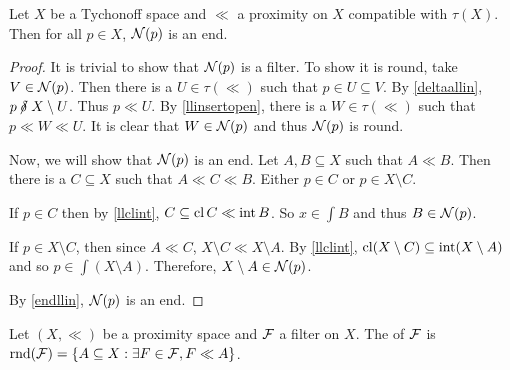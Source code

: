 \begin{theorem}
	\label{Nend}
	Let \( X \) be a Tychonoff space and \( \ll \) a proximity on \( X \) compatible with \( \tau(X) \).  Then for all \( p \in X \), \( \mathcal{N}(p) \) is an end.
\end{theorem}
\begin{proof}
	It is trivial to show that \( \mathcal{N}(p) \) is a filter.  To show it is round, take \( V \in \mathcal{N}(p) \).  Then there is a \( U \in \tau(\ll) \) such that \( p \in U \subseteq V \).  By \ref{deltaallin}, \( p \nnear X \setminus U \).  Thus \( p \ll U \).  By \ref{llinsertopen}, there is a \( W \in \tau(\ll) \) such that \( p \ll W \ll U \).  It is clear that \( W \in \mathcal{N}(p) \) and thus \( \mathcal{N}(p) \) is round.
	
	Now, we will show that \( \mathcal{N}(p) \) is an end.  Let \( A,B \subseteq X \) such that \( A \ll B \).  Then there is a \( C \subseteq X \) such that \( A \ll C \ll B \).  Either \( p \in C \) or \( p \in X \setminus C \).
	
	If \( p \in C \) then by \ref{llclint}, \( C \subseteq \operatorname{cl}{C} \ll \operatorname{int}{B} \).  So \( x \in \int{B} \) and thus \( B \in \mathcal{N}(p) \).
	
	If \( p \in X \setminus C \), then since \( A \ll C \), \( X \setminus C \ll X \setminus A \).  By \ref{llclint}, \( \operatorname{cl}(X \setminus C) \subseteq \operatorname{int}(X \setminus A) \) and so \( p \in \int(X \setminus A) \).  Therefore, \( X \setminus A \in \mathcal{N}(p) \).
	
	By \ref{endllin}, \( \mathcal{N}(p) \) is an end.
\end{proof}

\begin{definition}
	Let \( (X,\ll) \) be a proximity space and \( \mathcal{F} \) a filter on \( X \).  The  of \( \mathcal{F} \) is \( \operatorname{rnd}(\mathcal{F}) = \{ A \subseteq X: \exists F \in \mathcal{F}, F \ll A \} \).
\end{definition}

